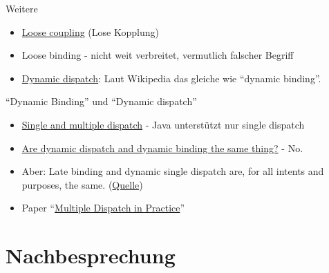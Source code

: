 \documentclass[usepdftitle=false,hyperref={pdfpagelabels=false}]{beamer}
\begin{document}
\begin{frame}{Weitere}
    \begin{itemize}
        \item \href{http://en.wikipedia.org/wiki/Loose_coupling}{Loose coupling} (Lose Kopplung)
        \item Loose binding - nicht weit verbreitet, vermutlich falscher Begriff
        \item \href{http://en.wikipedia.org/wiki/Dynamic_dispatch}{Dynamic dispatch}:
              Laut Wikipedia das gleiche wie "`dynamic binding"'.
    \end{itemize}
\end{frame}

\begin{frame}{"`Dynamic Binding"' und "`Dynamic dispatch"'}
    \begin{itemize}
        \item \href{http://en.wikipedia.org/wiki/Dynamic_dispatch\#Single_and_multiple_dispatch}{Single and multiple dispatch} - Java unterstützt nur single dispatch
        \item \href{http://stackoverflow.com/questions/533330/dynamic-dispatch-and-binding}{Are dynamic dispatch and dynamic binding the same thing?} - No.
        \item Aber: Late binding and dynamic single dispatch are, for all intents and purposes, the same. (\href{http://stackoverflow.com/a/9470993/562769}{Quelle})
        \item Paper "`\href{http://homepages.mcs.vuw.ac.nz/~alex/files/MuscheviciPotaninTemperoNobleOOPSLA2008.pdf}{Multiple Dispatch in Practice}"'
    \end{itemize}
\end{frame}

\section{Nachbesprechung}
\end{document}
